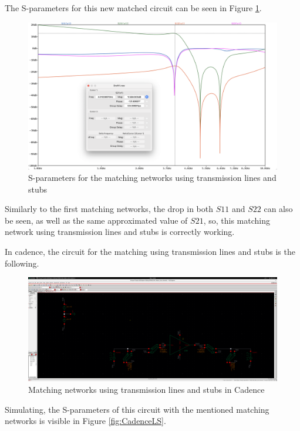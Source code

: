 The S-parameters for this new matched circuit can be seen in Figure \ref{fig:SIMLSMatching}.

\begin{figure}[H]
    \centering
    \includegraphics*[scale = 0.3]{Images/SIMLSmatching.png}
    \caption{S-parameters for the matching networks using transmission lines and stubs}
    \label{fig:SIMLSMatching}
\end{figure}

Similarly to the first matching networks, the drop in both $S11$ and $S22$ can also be seen, as well as the same approximated value of $S21$, so, this matching network using transmission lines and stubs is correctly working. 

In cadence, the circuit for the matching using transmission lines and stubs is the following.

\begin{figure}[H]
    \centering
    \includegraphics*[scale = 0.1]{Images/CadenceLScircuit.png}
    \caption{Matching networks using transmission lines and stubs in Cadence}
    \label{fig:CadenceLCcircuit}
\end{figure}

Simulating, the S-parameters of this circuit with the mentioned matching networks is visible in Figure \ref{fig:CadenceLS}.

